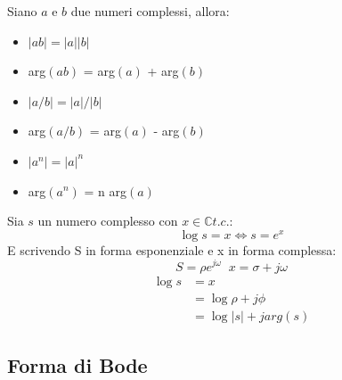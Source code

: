 \documentclass[a4paper]{article}
\begin{document}
\begin{property}
    Siano $a$ e $b$ due numeri complessi, allora:
    \begin{itemize}
        \item $|ab| = |a||b|$
        \item arg$(ab)$ = arg$(a)$ + arg$(b)$
        \item  $|a / b| = |a| / |b|$
        \item arg$(a / b)$ = arg$(a)$ - arg$(b)$
        \item $|a^n| = |a|^n$
        \item arg$(a^n)$ = n arg$(a)$
    \end{itemize}
\end{property}
\begin{property}
    Sia $s$ un numero complesso con $x \in \mathbb{C} t.c.:$
    \[\log s = x \Longleftrightarrow s = e^x\]
    E scrivendo S in forma esponenziale e x in forma complessa:
    \[S = \rho e^{j\omega} \; \; x = \sigma + j\omega\]
    \begin{align*}
        \log s &= x\\
        &= \log \rho + j\phi\\
        &= \log |s| + j arg(s)
    \end{align*}
\end{property}

\subsection{Forma di Bode}
\end{document}
